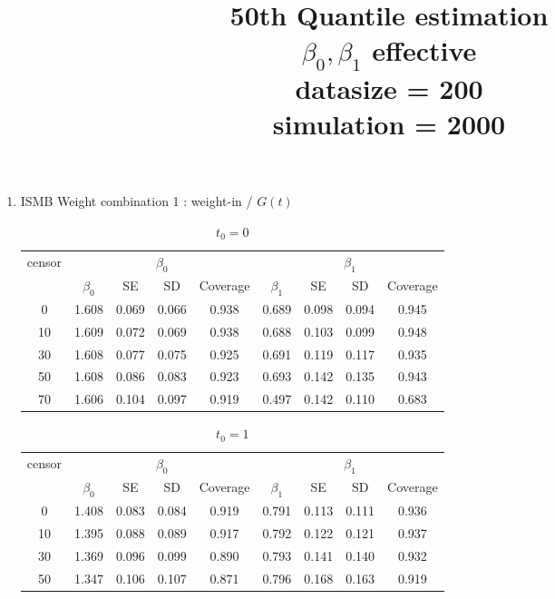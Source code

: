 \documentclass[12pt]{article}
\begin{document}
	\title{50th Quantile estimation\\
		$\beta_0, \beta_1$ effective\\
		datasize = 200\\
		simulation = 2000}
	\maketitle
	\newpage
	\begin{enumerate}
		\item {ISMB Weight combination 1 : weight-in / $G(t)$}
		\begin{table}[hbt!]
			\caption{$t_0=0$}
			\centering
			\begin{tabular}{|c|c|c|c|c|c|c|c|c|}
				\hline
				\multirow{2}{*}{censor} & \multicolumn{4}{c|}{$\beta_0$} & \multicolumn{4}{c|}{$\beta_1$}\\ \cline{2-9}
				 & $\beta_0$ & SE & SD  & Coverage  & $\beta_1$ & SE & SD & Coverage\\
				\hline\hline
				0 & 1.608 & 0.069 & 0.066 & 0.938 & 0.689 & 0.098 & 0.094 & 0.945 \\ 
  10 & 1.609 & 0.072 & 0.069 & 0.938 & 0.688 & 0.103 & 0.099 & 0.948 \\ 
  30 & 1.608 & 0.077 & 0.075 & 0.925 & 0.691 & 0.119 & 0.117 & 0.935 \\ 
  50 & 1.608 & 0.086 & 0.083 & 0.923 & 0.693 & 0.142 & 0.135 & 0.943 \\ 
  70 & 1.606 & 0.104 & 0.097 & 0.919 & 0.497 & 0.142 & 0.110 & 0.683 \\ 
				\hline
			\end{tabular}
		\end{table}
		\begin{table}[hbt!]
			\caption{$t_0=1$}
			\centering
			\begin{tabular}{|c|c|c|c|c|c|c|c|c|}
				\hline
				\multirow{2}{*}{censor} & \multicolumn{4}{c|}{$\beta_0$} & \multicolumn{4}{c|}{$\beta_1$}\\ \cline{2-9}
				& $\beta_0$ & SE & SD  & Coverage  & $\beta_1$ & SE & SD & Coverage\\
				\hline\hline
				0 & 1.408 & 0.083 & 0.084 & 0.919 & 0.791 & 0.113 & 0.111 & 0.936 \\ 
  10 & 1.395 & 0.088 & 0.089 & 0.917 & 0.792 & 0.122 & 0.121 & 0.937 \\ 
  30 & 1.369 & 0.096 & 0.099 & 0.890 & 0.793 & 0.141 & 0.140 & 0.932 \\ 
  50 & 1.347 & 0.106 & 0.107 & 0.871 & 0.796 & 0.168 & 0.163 & 0.919 \\ 

\end{tabular}
\end{table}
\end{enumerate}
\end{document}
